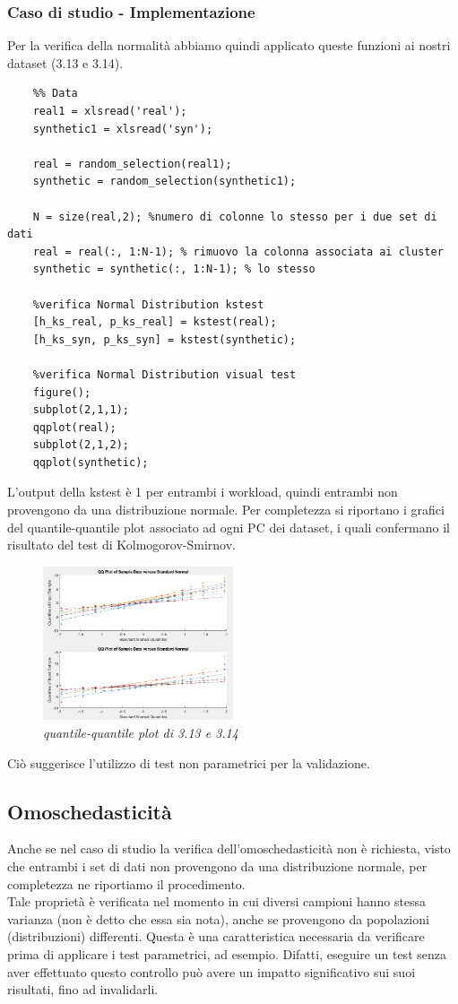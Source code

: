 \subsubsection{Caso di studio - Implementazione}
Per la verifica della normalità abbiamo quindi applicato queste funzioni ai nostri dataset (3.13 e 3.14).
\begin{verbatim}
	%% Data
	real1 = xlsread('real');
	synthetic1 = xlsread('syn');
	
	real = random_selection(real1);
	synthetic = random_selection(synthetic1);
	
	N = size(real,2); %numero di colonne lo stesso per i due set di dati
	real = real(:, 1:N-1); % rimuovo la colonna associata ai cluster
	synthetic = synthetic(:, 1:N-1); % lo stesso
	
	%verifica Normal Distribution kstest
	[h_ks_real, p_ks_real] = kstest(real);
	[h_ks_syn, p_ks_syn] = kstest(synthetic);
	
	%verifica Normal Distribution visual test
	figure();
	subplot(2,1,1);
	qqplot(real);
	subplot(2,1,2);
	qqplot(synthetic);
\end{verbatim}
L'output della kstest è 1 per entrambi i workload, quindi entrambi non provengono da una distribuzione normale. Per completezza si riportano i grafici del quantile-quantile plot associato ad ogni PC dei dataset, i quali confermano il risultato del test di Kolmogorov-Smirnov.
\begin{figure}[H]
	\centering
	\includegraphics[width=0.5\textwidth]{img/hw3/qqplot.png}
	\caption{\textit{quantile-quantile plot di 3.13 e 3.14}}
\end{figure}
Ciò suggerisce l'utilizzo di test non parametrici per la validazione.
\subsection{Omoschedasticità}
Anche se nel caso di studio la verifica dell'omoschedasticità non è richiesta, visto che entrambi i set di dati non provengono da una distribuzione normale, per completezza ne riportiamo il procedimento.
\\
Tale proprietà è verificata nel momento in cui diversi campioni hanno stessa varianza (non è detto che essa sia nota), anche se provengono da popolazioni (distribuzioni) differenti. Questa è una caratteristica necessaria da verificare prima di applicare i test parametrici, ad esempio. Difatti, eseguire un test senza aver effettuato questo controllo può avere un impatto significativo sui suoi risultati, fino ad invalidarli.
